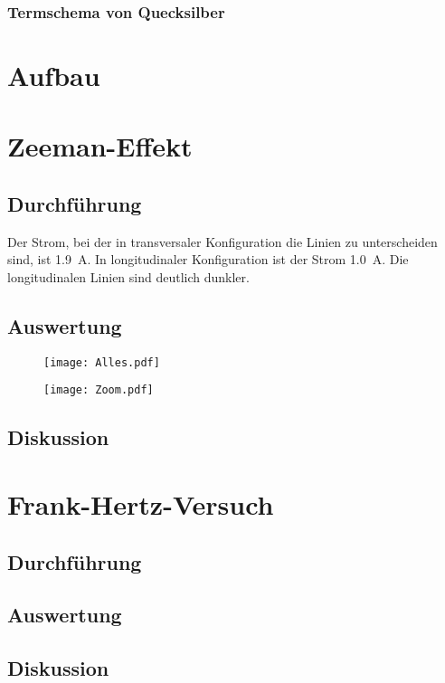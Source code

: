\subsection{Termschema von Quecksilber}

\chapter{Aufbau}

\chapter{Zeeman-Effekt}

\section{Durchführung}

Der Strom, bei der in transversaler Konfiguration die Linien zu unterscheiden
sind, ist \SI{1.9}{\ampere}. In longitudinaler Konfiguration ist der Strom
\SI{1.0}{\ampere}. Die longitudinalen Linien sind deutlich dunkler.

\section{Auswertung}

\begin{figure}[htbp]
    \centering
    \texttt{[image: Alles.pdf]}
    \caption{%
    }
    \label{fig:}
\end{figure}

\begin{figure}[htbp]
    \centering
    \texttt{[image: Zoom.pdf]}
    \caption{%
    }
    \label{fig:}
\end{figure}

\section{Diskussion}

\chapter{Frank-Hertz-Versuch}

\section{Durchführung}

\section{Auswertung}

\section{Diskussion}

\printbibliography



